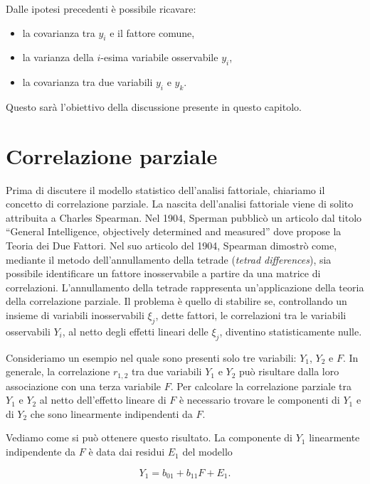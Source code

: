 \documentclass[
  11pt,
]{krantz}
\providecommand{\tightlist}{%
  \setlength{\itemsep}{0pt}\setlength{\parskip}{0pt}}
\theoremstyle{definition}
\theoremstyle{definition}
\theoremstyle{definition}
\theoremstyle{definition}
\theoremstyle{remark}
\begin{document}
Dalle ipotesi precedenti è possibile ricavare:

\begin{itemize}
\tightlist
\item
  la covarianza tra \(y_i\) e il fattore comune,
\item
  la varianza della \(i\)-esima variabile osservabile \(y_i\),
\item
  la covarianza tra due variabili \(y_i\) e \(y_k\).
\end{itemize}

Questo sarà l'obiettivo della discussione presente in questo capitolo.

\hypertarget{correlazione-parziale}{%
\section{Correlazione parziale}\label{correlazione-parziale}}

Prima di discutere il modello statistico dell'analisi fattoriale, chiariamo il concetto di correlazione parziale. La nascita dell'analisi fattoriale viene di solito attribuita a Charles Spearman. Nel 1904, Sperman pubblicò un articolo dal titolo ``General Intelligence, objectively determined and measured'' dove propose la Teoria dei Due Fattori. Nel suo articolo del 1904, Spearman dimostrò come, mediante il metodo dell'annullamento della tetrade (\emph{tetrad differences}), sia possibile identificare un fattore inosservabile a partire da una matrice di correlazioni. L'annullamento della tetrade rappresenta un'applicazione della teoria della correlazione parziale. Il problema è quello di stabilire se, controllando un insieme di variabili inosservabili \(\xi_j\), dette fattori, le correlazioni tra le variabili osservabili \(Y_i\), al netto degli effetti lineari delle \(\xi_j\), diventino statisticamente nulle.

Consideriamo un esempio nel quale sono presenti solo tre variabili: \(Y_1\), \(Y_2\) e \(F\). In generale, la correlazione \(r_{1,2}\) tra due variabili \(Y_1\) e \(Y_2\) può risultare dalla loro associazione con una terza variabile \(F\). Per calcolare la correlazione parziale tra \(Y_1\) e \(Y_2\) al netto dell'effetto lineare di \(F\) è necessario trovare le componenti di \(Y_1\) e di \(Y_2\) che sono linearmente indipendenti da \(F\).

Vediamo come si può ottenere questo risultato. La componente di \(Y_1\) linearmente indipendente da \(F\) è data dai residui \(E_1\) del modello

\[
Y_1 = b_{01} + b_{11}F + E_1.
\]
\end{document}
